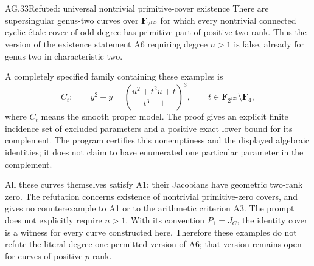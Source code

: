 \begin{claim}{AG.33}{Refuted: universal nontrivial primitive-cover existence}
There are supersingular genus-two curves over
$\mathbf F_{2^{128}}$ for which every nontrivial connected
cyclic \'etale cover of odd degree has primitive part of
positive two-rank. Thus the version of the existence statement
A6 requiring degree $n>1$ is false, already for genus two
in characteristic two.

A completely specified family containing these examples is
\[
 C_t:\qquad y^2+y=
       \left(\frac{u^2+t^2u+t}{t^3+1}\right)^3,
 \qquad
 t\in\mathbf F_{2^{128}}\setminus\mathbf F_4,       \tag{AG.33.1}
\]
where $C_t$ means the smooth proper model. The proof gives
an explicit finite incidence set of excluded parameters
and a positive exact lower bound for its complement.
The program certifies this nonemptiness and the displayed
algebraic identities; it does not claim to have enumerated
one particular parameter in the complement.

All these curves themselves satisfy A1: their Jacobians
have geometric two-rank zero. The refutation concerns
existence of nontrivial primitive-zero covers, and gives no
counterexample to A1 or to the arithmetic criterion A3.
The prompt does not explicitly require $n>1$. With its
convention $P_1=J_C$, the identity cover is a witness for
every curve constructed here. Therefore these examples
do not refute the literal degree-one-permitted version
of A6; that version remains open for curves of positive
$p$-rank.
\end{claim}
